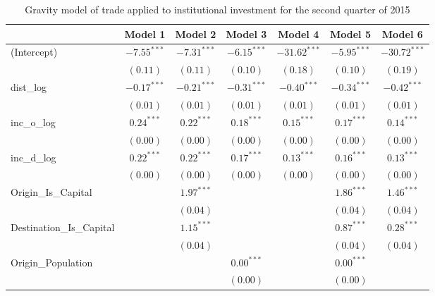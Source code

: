 \begin{table}
	\begin{center}
		\small
		\caption[CGravity Model of Trade for Q2 2015]{Gravity model of trade applied to institutional investment for the second quarter of 2015}
		\begin{tabular}{l c c c c c c }
			\hline
			& Model 1 & Model 2 & Model 3 & Model 4 & Model 5 & Model 6 \\
			\hline
			(Intercept)                  & $-7.55^{***}$ & $-7.31^{***}$ & $-6.15^{***}$ & $-31.62^{***}$ & $-5.95^{***}$ & $-30.72^{***}$ \\
			& $(0.11)$      & $(0.11)$      & $(0.10)$      & $(0.18)$       & $(0.10)$      & $(0.19)$       \\
			dist\_log                    & $-0.17^{***}$ & $-0.21^{***}$ & $-0.31^{***}$ & $-0.40^{***}$  & $-0.34^{***}$ & $-0.42^{***}$  \\
			& $(0.01)$      & $(0.01)$      & $(0.01)$      & $(0.01)$       & $(0.01)$      & $(0.01)$       \\
			inc\_o\_log                  & $0.24^{***}$  & $0.22^{***}$  & $0.18^{***}$  & $0.15^{***}$   & $0.17^{***}$  & $0.14^{***}$   \\
			& $(0.00)$      & $(0.00)$      & $(0.00)$      & $(0.00)$       & $(0.00)$      & $(0.00)$       \\
			inc\_d\_log                  & $0.22^{***}$  & $0.22^{***}$  & $0.17^{***}$  & $0.13^{***}$   & $0.16^{***}$  & $0.13^{***}$   \\
			& $(0.00)$      & $(0.00)$      & $(0.00)$      & $(0.00)$       & $(0.00)$      & $(0.00)$       \\
			Origin\_Is\_Capital          &               & $1.97^{***}$  &               &                & $1.86^{***}$  & $1.46^{***}$   \\
			&               & $(0.04)$      &               &                & $(0.04)$      & $(0.04)$       \\
			Destination\_Is\_Capital     &               & $1.15^{***}$  &               &                & $0.87^{***}$  & $0.28^{***}$   \\
			&               & $(0.04)$      &               &                & $(0.04)$      & $(0.04)$       \\
			Origin\_Population           &               &               & $0.00^{***}$  &                & $0.00^{***}$  &                \\
			&               &               & $(0.00)$      &                & $(0.00)$      &                \\

\end{tabular}
\end{center}
\end{table}
